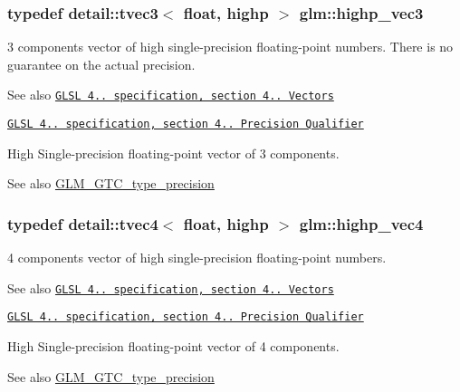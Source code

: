 \subsubsection[{\texorpdfstring{highp\+\_\+vec3}{highp_vec3}}]{\setlength{\rightskip}{0pt plus 5cm}typedef detail\+::tvec3$<$ float, highp $>$ {\bf glm\+::highp\+\_\+vec3}}\hypertarget{group__core__precision_ga4879124da7a18d6b681d933cb8c4267d}{}\label{group__core__precision_ga4879124da7a18d6b681d933cb8c4267d}
3 components vector of high single-\/precision floating-\/point numbers. There is no guarantee on the actual precision.

\begin{DoxySeeAlso}{See also}
\href{http://www.opengl.org/registry/doc/GLSLangSpec.4.20.8.pdf}{\tt G\+L\+SL 4.. specification, section 4.. Vectors} 

\href{http://www.opengl.org/registry/doc/GLSLangSpec.4.20.8.pdf}{\tt G\+L\+SL 4.. specification, section 4.. Precision Qualifier}
\end{DoxySeeAlso}
High Single-\/precision floating-\/point vector of 3 components. \begin{DoxySeeAlso}{See also}
\hyperlink{group__gtc__type__precision}{G\+L\+M\+\_\+\+G\+T\+C\+\_\+type\+\_\+precision} 
\end{DoxySeeAlso}
\subsubsection[{\texorpdfstring{highp\+\_\+vec4}{highp_vec4}}]{\setlength{\rightskip}{0pt plus 5cm}typedef detail\+::tvec4$<$ float, highp $>$ {\bf glm\+::highp\+\_\+vec4}}\hypertarget{group__core__precision_gae32d5f99860247afbe7ed90564bceac1}{}\label{group__core__precision_gae32d5f99860247afbe7ed90564bceac1}
4 components vector of high single-\/precision floating-\/point numbers.

\begin{DoxySeeAlso}{See also}
\href{http://www.opengl.org/registry/doc/GLSLangSpec.4.20.8.pdf}{\tt G\+L\+SL 4.. specification, section 4.. Vectors} 

\href{http://www.opengl.org/registry/doc/GLSLangSpec.4.20.8.pdf}{\tt G\+L\+SL 4.. specification, section 4.. Precision Qualifier}
\end{DoxySeeAlso}
High Single-\/precision floating-\/point vector of 4 components. \begin{DoxySeeAlso}{See also}
\hyperlink{group__gtc__type__precision}{G\+L\+M\+\_\+\+G\+T\+C\+\_\+type\+\_\+precision} 
\end{DoxySeeAlso}
